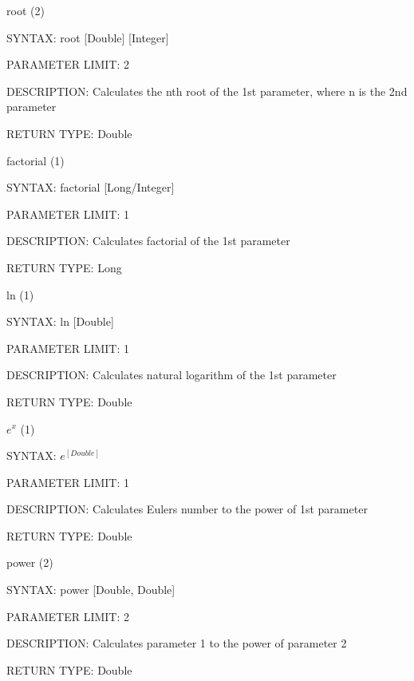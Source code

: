 \documentclass{article}
\begin{document}
\begin{flushleft}
root (2)
\begin{compactitem}
  \item [] SYNTAX: root [Double] [Integer]
  \item [] PARAMETER LIMIT: 2
  \item [] DESCRIPTION: Calculates the nth root of the 1st parameter, where n is
               the 2nd parameter
  \item [] RETURN TYPE: Double
\end{compactitem}
\medskip

factorial (1)
\begin{compactitem}
  \item [] SYNTAX: factorial [Long/Integer]
  \item [] PARAMETER LIMIT: 1
  \item [] DESCRIPTION: Calculates factorial of the 1st parameter
  \item [] RETURN TYPE: Long
\end{compactitem}
\medskip

ln (1)
\begin{compactitem}
  \item [] SYNTAX: ln [Double]
  \item [] PARAMETER LIMIT: 1
  \item [] DESCRIPTION: Calculates natural logarithm of the 1st parameter
  \item [] RETURN TYPE: Double
\end{compactitem}
\medskip

$e^x$ (1)
\begin{compactitem}
  \item [] SYNTAX: $e^[Double]$
  \item [] PARAMETER LIMIT: 1
  \item [] DESCRIPTION: Calculates Eulers number to the power of 1st parameter
  \item [] RETURN TYPE: Double
\end{compactitem}
\medskip

power (2)
\begin{compactitem}
  \item [] SYNTAX: power [Double, Double]
  \item [] PARAMETER LIMIT: 2
  \item [] DESCRIPTION: Calculates parameter 1 to the power of parameter 2
  \item [] RETURN TYPE: Double
\end{compactitem}
\medskip

\end{flushleft}
\end{document}
